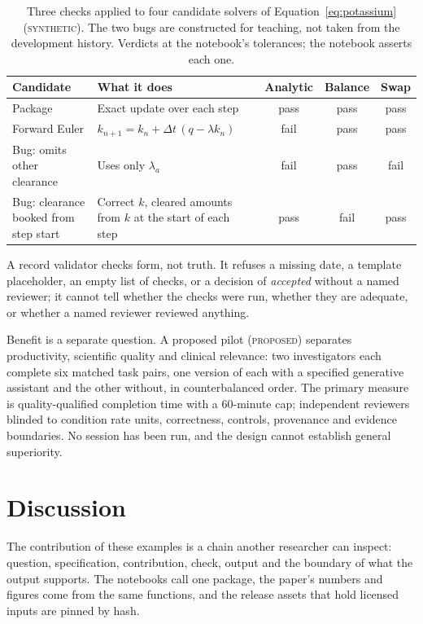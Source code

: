 \documentclass[11pt,a4paper]{article}
\newcommand{\evidence}[1]{\textsc{#1}}
\begin{document}
\begin{table}[htbp]
\centering\small
\caption{Three checks applied to four candidate solvers of
Equation~\eqref{eq:potassium} (\evidence{synthetic}). The two bugs are
constructed for teaching, not taken from the development history. Verdicts
at the notebook's tolerances; the notebook asserts each one.}
\label{tab:checks}
\begin{tabularx}{\textwidth}{@{}p{}Lccc@{}}
\toprule
Candidate & What it does & Analytic & Balance & Swap\\
\midrule
Package & Exact update over each step & pass & pass & pass\\
Forward Euler & $k_{n+1}=k_n+\Delta t\,(q-\lambda k_n)$ & fail & pass & pass\\
Bug: omits other clearance & Uses only $\lambda_a$ & fail & pass & fail\\
Bug: clearance booked from step start & Correct $k$, cleared amounts from $k$
at the start of each step & pass & fail & pass\\
\bottomrule
\end{tabularx}
\end{table}

A record validator checks form, not truth. It refuses a missing date, a
template placeholder, an empty list of checks, or a decision of
\emph{accepted} without a named reviewer; it cannot tell whether the checks
were run, whether they are adequate, or whether a named reviewer reviewed
anything.

Benefit is a separate question. A proposed pilot (\evidence{proposed})
separates productivity, scientific quality and clinical relevance: two
investigators each complete six matched task pairs, one version of each with
a specified generative assistant and the other without, in counterbalanced
order. The primary measure is quality-qualified completion time with a
60-minute cap; independent reviewers blinded to condition rate units,
correctness, controls, provenance and evidence boundaries. No session has
been run, and the design cannot establish general superiority.

\section{Discussion}
\label{sec:discussion}

The contribution of these examples is a chain another researcher can
inspect: question, specification, contribution, check, output and the
boundary of what the output supports. The notebooks call one package, the
paper's numbers and figures come from the same functions, and the release
assets that hold licensed inputs are pinned by hash.
\end{document}
